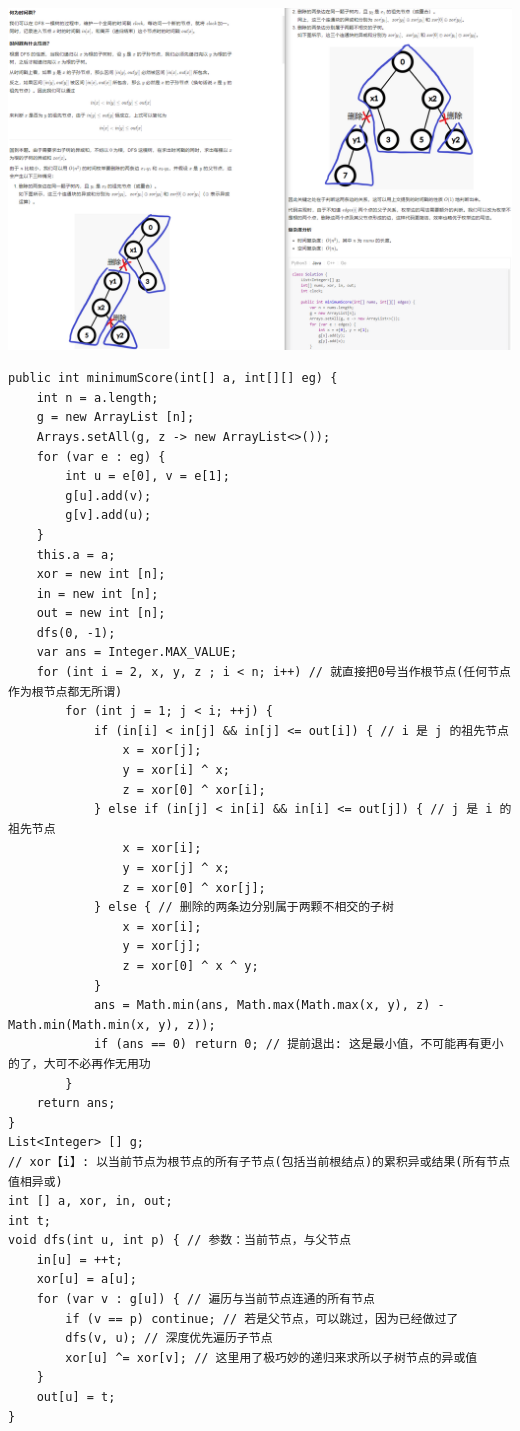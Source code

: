 \documentclass[9pt, b5paaper]{book}
\begin{document}
\includegraphics[width=.9\linewidth]{./pic/2322.png}
\begin{verbatim}
public int minimumScore(int[] a, int[][] eg) {
    int n = a.length;
    g = new ArrayList [n];
    Arrays.setAll(g, z -> new ArrayList<>());
    for (var e : eg) {
        int u = e[0], v = e[1];
        g[u].add(v);
        g[v].add(u);
    }
    this.a = a;
    xor = new int [n];
    in = new int [n];
    out = new int [n];
    dfs(0, -1);
    var ans = Integer.MAX_VALUE;
    for (int i = 2, x, y, z ; i < n; i++) // 就直接把0号当作根节点(任何节点作为根节点都无所谓)
        for (int j = 1; j < i; ++j) {
            if (in[i] < in[j] && in[j] <= out[i]) { // i 是 j 的祖先节点
                x = xor[j];
                y = xor[i] ^ x;
                z = xor[0] ^ xor[i];
            } else if (in[j] < in[i] && in[i] <= out[j]) { // j 是 i 的祖先节点
                x = xor[i];
                y = xor[j] ^ x;
                z = xor[0] ^ xor[j];
            } else { // 删除的两条边分别属于两颗不相交的子树
                x = xor[i];
                y = xor[j];
                z = xor[0] ^ x ^ y;
            }
            ans = Math.min(ans, Math.max(Math.max(x, y), z) - Math.min(Math.min(x, y), z));
            if (ans == 0) return 0; // 提前退出: 这是最小值，不可能再有更小的了，大可不必再作无用功
        }
    return ans;
}       
List<Integer> [] g;
// xor【i】: 以当前节点为根节点的所有子节点(包括当前根结点)的累积异或结果(所有节点值相异或)
int [] a, xor, in, out; 
int t;
void dfs(int u, int p) { // 参数：当前节点，与父节点
    in[u] = ++t; 
    xor[u] = a[u];
    for (var v : g[u]) { // 遍历与当前节点连通的所有节点
        if (v == p) continue; // 若是父节点，可以跳过，因为已经做过了
        dfs(v, u); // 深度优先遍历子节点
        xor[u] ^= xor[v]; // 这里用了极巧妙的递归来求所以子树节点的异或值
    }
    out[u] = t;
}
\end{verbatim}
\end{document}

